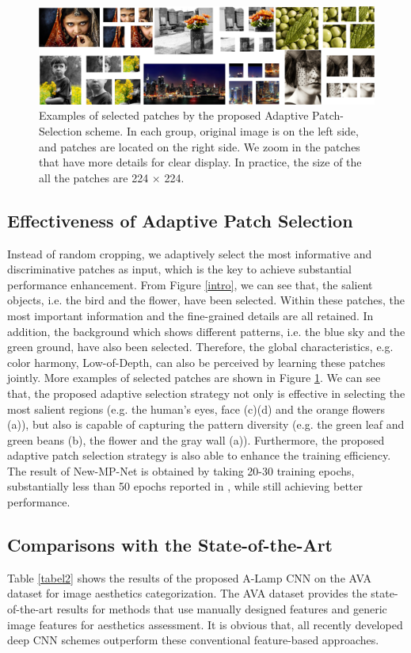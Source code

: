 \documentclass[10pt,twocolumn,letterpaper]{article}
\begin{document}
\begin{figure}
	\centering
	\includegraphics[scale=0.11]{figures/patch_selection.jpg}
	\caption{Examples of selected patches by the proposed Adaptive Patch-Selection scheme. In each group, original image is on the left side, and patches are located on the right side. We zoom in the patches that have more details for clear display. In practice, the size of the all the patches are 224 $\times$ 224. }
	\label{patches}
	\vspace{-3mm}
\end{figure}
\subsection{Effectiveness of Adaptive Patch Selection}
Instead of random cropping, we adaptively select the most informative and discriminative patches as input, which is the key to achieve substantial performance enhancement. From Figure \ref{intro}, we can see that, the salient objects, i.e. the bird and the flower, have been selected. Within these patches, the most important information and the fine-grained details are all retained. In addition, the background which shows different patterns, i.e. the blue sky and the green ground, have also been selected. Therefore, the global characteristics, e.g. color harmony, Low-of-Depth, can also be perceived by learning these patches jointly. More examples of selected patches are shown in Figure \ref{patches}. We can see that, the proposed adaptive selection strategy not only is effective in selecting the most salient regions (e.g. the human's eyes, face (c)(d) and the orange flowers (a)), but also is capable of capturing the pattern diversity (e.g. the green leaf and green beans (b), the flower and the gray wall (a)). Furthermore, the proposed adaptive patch selection strategy is also able to enhance the training efficiency. The result of New-MP-Net is obtained by taking 20-30 training epochs, substantially less than 50 epochs reported in \cite{Lu:2015:ICCV}, while still achieving  better performance. 

\subsection{Comparisons with the State-of-the-Art}
Table \ref{tabel2} shows the results of the proposed A-Lamp CNN on the AVA dataset \cite{Murray:MMP2012:AVA} for image aesthetics categorization. The AVA dataset provides the state-of-the-art results for methods that use manually designed features and generic image features for aesthetics assessment. It is obvious that, all recently developed deep CNN schemes outperform these conventional feature-based approaches.
\end{document}
